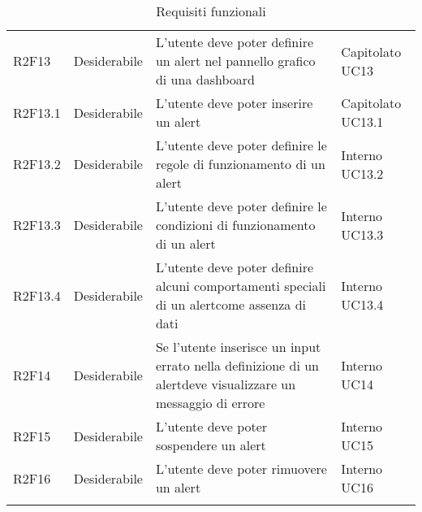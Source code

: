 \begin{longtable} {
		>{}p{24mm} 
		>{}p{32mm}
		>{}p{40mm} 
		>{}p{24.5mm}
		}
			R2F13 &	Desiderabile & L'utente deve poter definire un alert nel pannello grafico di una dashboard\glo & Capitolato UC13 \TBstrut \\ [2mm]			
		R2F13.1 & Desiderabile & L'utente deve poter inserire un alert & Capitolato UC13.1 \TBstrut \\ [2mm]		
		R2F13.2 & Desiderabile & L'utente deve poter definire le regole di funzionamento di un alert\glo & Interno UC13.2 \TBstrut \\ [2mm]		
		R2F13.3 & Desiderabile & L'utente deve poter definire le condizioni di funzionamento di un alert\glo & Interno UC13.3 \TBstrut \\ [2mm]
		R2F13.4 & Desiderabile & L'utente deve poter definire alcuni comportamenti speciali di un alert\glo come assenza di dati & Interno UC13.4 \TBstrut \\ [2mm]		
		R2F14 &	Desiderabile & Se l'utente inserisce un input errato nella definizione di un alert\glosp deve visualizzare un messaggio di errore &	Interno UC14 \TBstrut \\ [2mm]
		R2F15 &	Desiderabile & L'utente deve poter sospendere un alert\glo & Interno UC15 \TBstrut \\ [2mm]		
		R2F16 & Desiderabile & L'utente deve poter rimuovere un alert\glo & Interno UC16 \TBstrut \\ [2mm]	
		\rowcolor{white}
		\caption{Requisiti funzionali}
	\end{longtable}